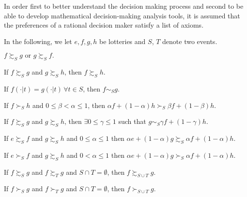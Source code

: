 In order first to better understand the decision making process and second to be able to develop mathematical decision-making analysis tools, it is assumed that the preferences of a rational decision maker satisfy a list of axioms.

In the following, we let $e, f, g, h$ be lotteries and $S$, $T$ denote two events.

\begin{axiom}[Completeness]
$f \succsim_S g \text{ or } g \succsim_S f.$
\label{ch1axcompleteness}
\end{axiom}
\begin{axiom}[Transitivity]
If $f \succsim_S g$ and $g \succsim_S h$, then $f \succsim_S h$.
\label{ch1:ax:trans}
\end{axiom}
\begin{axiom}[Relevance]
If $f(\cdot | t) = g(\cdot | t) \, \forall t \in S$, then $f \sim_S g$.
\label{ch1:ax:rel}
\end{axiom}
\begin{axiom}[Monotonicity]
If $f \succ_S h$ and $0 \leq \beta < \alpha \leq 1$, then $\alpha f + (1-\alpha) h \succ_S \beta f + (1-\beta) h$.
\label{ch1:ax:mono}
\end{axiom}
\begin{axiom}[Continuity]
If $f \succsim_S g$ and $g \succsim_S h$, then $\exists 0 \leq \gamma \leq 1$ such that $g \sim_S \gamma f + (1-\gamma) h$.
\label{ch1:ax:conti}
\end{axiom}
\begin{axiom}
If $e \succsim_S f$ and $g \succsim_S h$ and $ 0 \leq \alpha \leq 1$ then $\alpha e + (1-\alpha) g \succsim_S \alpha f + (1-\alpha) h.$
\label{ch1:ax:objsub}
\end{axiom}
\begin{axiom}
If $e \succ_S f$ and $g \succsim_S h$ and $ 0 < \alpha \leq 1$ then $\alpha e + (1-\alpha) g \succ_S \alpha f + (1-\alpha) h.$
\label{ch1:ax:sobjsub}
\end{axiom}
\begin{axiom}
If $f \succsim_S g$ and $f \succsim_T g$ and $S \cap T = \emptyset$, then $f \succsim_{S \cup T} g$.
\label{ch1:ax:subsub}
\end{axiom}
\begin{axiom}
If $f \succ_S g$ and $f \succ_T g$ and $S \cap T = \emptyset$, then $f \succ_{S \cup T} g$.
\label{ch1:ax:ssubsub}
\end{axiom}

